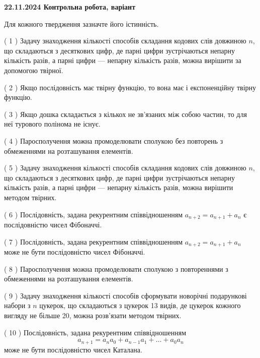 \documentclass[12pt, ukrainian]{article}
\begin{document}
\vspace{4mm}
\newpage
\begin {large}

\textbf{22.11.2024 Контрольна робота, варіант  }\par


{
Для кожного твердження зазначте його істинність.\par
\vspace{2mm}
( 1 ) Задачу знаходження кількості способів складання кодових слів довжиною $n$, що складаються з десяткових цифр, де парні цифри зустрічаються непарну кількість разів, а парні цифри — непарну кількість разів, можна вирішити за допомогою твірної.%

( 2 ) Якщо послідовність має твірну функцію, то вона має і експоненційну твірну функцію.%

( 3 ) Якщо дошка складається з кількох не зв’язаних між собою частин, то для неї турового полінома не існує.%

( 4 ) Паросполучення можна промоделювати сполукою без повторень з обмеженнями на розташування елементів.%

( 5 ) Задачу знаходження кількості способів складання кодових слів довжиною $n$, що складаються з десяткових цифр, де парні цифри зустрічаються непарну кількість разів, а парні цифри — непарну кількість разів, можна вирішити методом твірних.%

( 6 ) Послідовність, задана рекурентним співвідношенням $a_{n+2}=a_{n+1}+a_{n}$ є послідовністю чисел Фібоначчі.%

( 7 ) Послідовність, задана рекурентним співвідношенням $a_{n+2}=a_{n+1}+a_{n}$ може не бути послідовністю чисел Фібоначчі.%

( 8 ) Паросполучення можна промоделювати сполукою з повтореннями з обмеженнями на розташування елементів.%

( 9 ) Задачу знаходження кількості способів сформувати новорічні подарункові набори з $n$ цукерок, що складаються з цукерок 13 видів, де цукерок кожного вигляду не більше 20, можна розв’язати методом твірних.%

( 10 ) Послідовність, задана рекурентним співвідношенням $$a_{n+1}=a_{n}a_{0}+a_{n-1}a_{1}+\ldots+a_0a_{n}$$ може не бути послідовністю чисел Каталана.%


\vspace{5mm}
}
\end {large}
\end{document}
